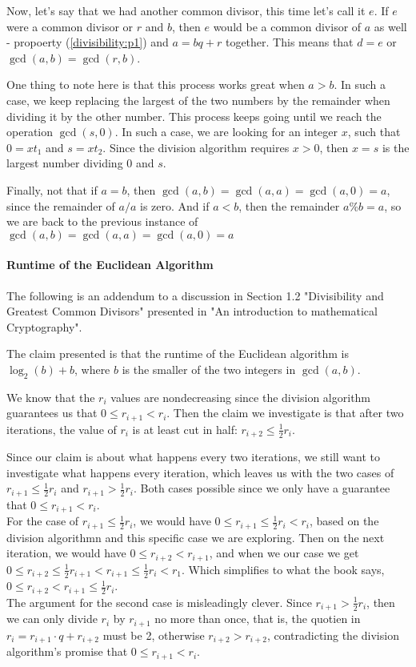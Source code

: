 Now, let's say that we had another common divisor, this time let's call it $e$.
If $e$ were a common divisor or $r$ and $b$, then $e$ would be a common divisor of $a$ as well
- propoerty (\ref{divisibility:p1}) and $a = bq + r$ together.
This means that $d = e$ or $\gcd(a,b) = \gcd(r,b)$.

One thing to note here is that this process works great when $a > b$.
In such a case, we keep replacing the largest of the two numbers by the remainder when dividing it by the other number.
This process keeps going until we reach the operation $\gcd(s,0)$.
In such a case, we are looking for an integer $x$, such that $0 = xt_1$ and $s = xt_2$.
Since the division algorithm requires $x>0$, then $x=s$ is the largest number dividing $0$ and $s$.

Finally, not that if $a=b$, then $\gcd(a,b) = \gcd(a,a) = \gcd(a,0) = a$, since the remainder of $a/a$ is zero.
And if $a < b$, then the remainder $a\%b = a$, so we are back to the previous instance of $\gcd(a,b) = \gcd(a,a) = \gcd(a,0) = a$


\paragraph{Runtime of the Euclidean Algorithm}

The following is an addendum to a discussion in Section 1.2 "Divisibility and Greatest Common Divisors"
presented in "An introduction to mathematical Cryptography".

The claim presented is that the runtime of the Euclidean algorithm is $\log_2 (b) + b$, where $b$ is the smaller of the
two integers in $\gcd(a,b)$.

We know that the $r_i$ values are nondecreasing since the division algorithm guarantees us that
$0 \leq r_{i+1} < r_i$.
Then the claim we investigate is that after two iterations, the value of $r_i$ is at least cut in half:
$r_{i+2} \leq \frac{1}{2}r_i$.

Since our claim is about what happens every two iterations, we still want to investigate what happens every iteration,
which leaves us with the two cases of $r_{i+1} \leq \frac{1}{2}r_i$ and $r_{i+1} > \frac{1}{2}r_i$.
Both cases possible since we only have a guarantee that $0 \leq r_{i+1} < r_i$.
\\

For the case of $r_{i+1} \leq \frac{1}{2}r_i$, we would have $0 \leq r_{i+1} \leq \frac{1}{2}r_i < r_i$, based on the
division algorithmn and this specific case we are exploring.
Then on the next iteration, we would have $0 \leq r_{i+2} < r_{i+1}$, and when we our case we get
$0 \leq r_{i+2} \leq \frac{1}{2}r_{i+1} < r_{i+1} \leq \frac{1}{2}r_i < r_1$.
Which simplifies to what the book says, $0 \leq r_{i+2} < r_{i+1} \leq \frac{1}{2}r_i$.
\\

The argument for the second case is misleadingly clever.
Since $r_{i+1} > \frac{1}{2}r_i$, then we can only divide $r_i$ by $r_{i+1}$ no more than once,
that is, the quotien in $r_i = r_{i+1}\cdot q + r_{i+2}$ must be 2, otherwise $r_{i+2} > r_{i+2}$,
contradicting the division algorithm's promise that $0 \leq r_{i+1} < r_i$.